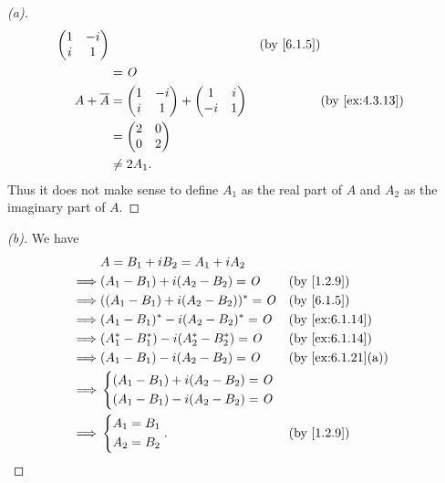 \begin{proof}[(a)]
\begin{align*}
{\begin{pmatrix}
				                                                 1 & -i \\
				                                                 i & 1
			                                                 \end{pmatrix}} &  & \by{6.1.5} \\
		             & = \zm                                                            \\
		A + \conj{A} & = \begin{pmatrix}
			                 1 & -i \\
			                 i & 1
		                 \end{pmatrix} + \begin{pmatrix}
			                                 1  & i \\
			                                 -i & 1
		                                 \end{pmatrix}   &  & \by{ex:4.3.13}            \\
		             & = \begin{pmatrix}
			                 2 & 0 \\
			                 0 & 2
		                 \end{pmatrix}                                                 \\
		             & \neq 2 A_1.
	\end{align*}
	Thus it does not make sense to define \(A_1\) as the real part of \(A\) and \(A_2\) as the imaginary part of \(A\).
\end{proof}

\begin{proof}[(b)]
	We have
	\begin{align*}
		         & A = B_1 + i B_2 = A_1 + i A_2                                    \\
		\implies & (A_1 - B_1) + i (A_2 - B_2) = \zm         &  & \by{1.2.9}        \\
		\implies & ((A_1 - B_1) + i (A_2 - B_2))^* = \zm     &  & \by{6.1.5}        \\
		\implies & (A_1 - B_1)^* - i (A_2 - B_2)^* = \zm     &  & \by{ex:6.1.14}    \\
		\implies & (A_1^* - B_1^*) - i (A_2^* - B_2^*) = \zm &  & \by{ex:6.1.14}    \\
		\implies & (A_1 - B_1) - i (A_2 - B_2) = \zm         &  & \by{ex:6.1.21}[a] \\
		\implies & \begin{dcases}
			           (A_1 - B_1) + i (A_2 - B_2) = \zm \\
			           (A_1 - B_1) - i (A_2 - B_2) = \zm
		           \end{dcases}                                \\
		\implies & \begin{dcases}
			           A_1 = B_1 \\
			           A_2 = B_2
		           \end{dcases}.                            &  & \by{1.2.9}
	\end{align*}
\end{proof}

